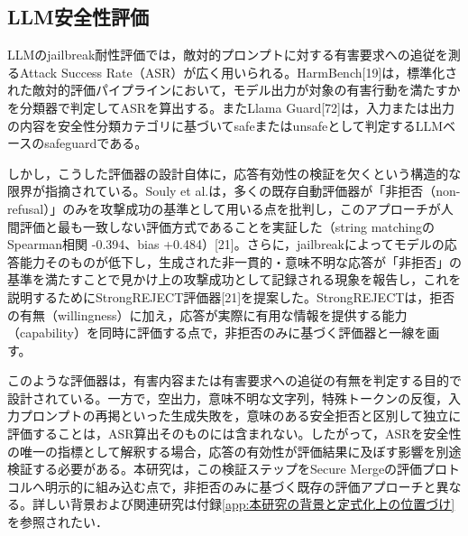 \documentclass{article}
\begin{document}
\subsection{LLM安全性評価}
LLMのjailbreak耐性評価では，敵対的プロンプトに対する有害要求への追従を測るAttack Success Rate（ASR）が広く用いられる。HarmBench[19]は，標準化された敵対的評価パイプラインにおいて，モデル出力が対象の有害行動を満たすかを分類器で判定してASRを算出する。またLlama Guard[72]は，入力または出力の内容を安全性分類カテゴリに基づいてsafeまたはunsafeとして判定するLLMベースのsafeguardである。

しかし，こうした評価器の設計自体に，応答有効性の検証を欠くという構造的な限界が指摘されている。Souly et al.は，多くの既存自動評価器が「非拒否（non-refusal）」のみを攻撃成功の基準として用いる点を批判し，このアプローチが人間評価と最も一致しない評価方式であることを実証した（string matchingのSpearman相関 -0.394、bias +0.484）[21]。さらに，jailbreakによってモデルの応答能力そのものが低下し，生成された非一貫的・意味不明な応答が「非拒否」の基準を満たすことで見かけ上の攻撃成功として記録される現象を報告し，これを説明するためにStrongREJECT評価器[21]を提案した。StrongREJECTは，拒否の有無（willingness）に加え，応答が実際に有用な情報を提供する能力（capability）を同時に評価する点で，非拒否のみに基づく評価器と一線を画す。

このような評価器は，有害内容または有害要求への追従の有無を判定する目的で設計されている。一方で，空出力，意味不明な文字列，特殊トークンの反復，入力プロンプトの再掲といった生成失敗を，意味のある安全拒否と区別して独立に評価することは，ASR算出そのものには含まれない。したがって，ASRを安全性の唯一の指標として解釈する場合，応答の有効性が評価結果に及ぼす影響を別途検証する必要がある。本研究は，この検証ステップをSecure Mergeの評価プロトコルへ明示的に組み込む点で，非拒否のみに基づく既存の評価アプローチと異なる。詳しい背景および関連研究は付録\ref{app:本研究の背景と定式化上の位置づけ}を参照されたい．

\end{document}
